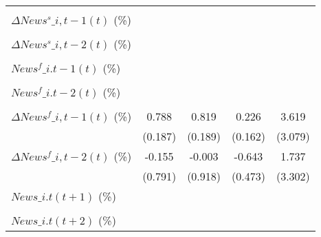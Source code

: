 {\begin{tabular}{l*{4}{c}}
                    &                     &                     &                     &                     \\
\addlinespace
$ \Delta News^s\_{i,t-1}(t)$ (\%)&                     &                     &                     &                     \\
                    &                     &                     &                     &                     \\
\addlinespace
$ \Delta News^s\_{i,t-2}(t)$ (\%)&                     &                     &                     &                     \\
                    &                     &                     &                     &                     \\
\addlinespace
$ News^f\_{i.t-1}(t)$ (\%)&                     &                     &                     &                     \\
                    &                     &                     &                     &                     \\
\addlinespace
$ News^f\_{i.t-2}(t)$ (\%)&                     &                     &                     &                     \\
                    &                     &                     &                     &                     \\
\addlinespace
$ \Delta News^f\_{i,t-1}(t)$ (\%)&       0.788\sym{***}&       0.819\sym{***}&       0.226         &       3.619         \\
                    &     (0.187)         &     (0.189)         &     (0.162)         &     (3.079)         \\
\addlinespace
$ \Delta News^f\_{i,t-2}(t)$ (\%)&      -0.155         &      -0.003         &      -0.643         &       1.737         \\
                    &     (0.791)         &     (0.918)         &     (0.473)         &     (3.302)         \\
\addlinespace
$ News\_{i.t}(t+1)$ (\%)&                     &                     &                     &                     \\
                    &                     &                     &                     &                     \\
\addlinespace
$ News\_{i.t}(t+2)$ (\%)&                     &                     &                     &                     \\

\end{tabular}}
